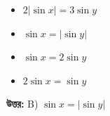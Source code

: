 \documentclass[12pt, a4paper]{article}
\begin{document}
\begin{itemize}[label={}, leftmargin=1cm, itemsep=0.5em]
    \item[\textbf{A)}] $2|\sin x| = 3\sin y$
    \item[\textbf{B)}] $\sin x = |\sin y|$
    \item[\textbf{C)}] $\sin x = 2\sin y$
    \item[\textbf{D)}] $2\sin x = \sin y$
\end{itemize}

\vspace{0.5em}
\begin{tcolorbox}[answerbox]
    \textbf{\color{success} উত্তর:} B) $\sin x = |\sin y|$
\end{tcolorbox}
\vspace{1em}
\end{document}
